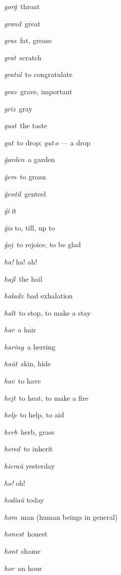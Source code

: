 \begin{landscape}
\begin{multicols}{5}
\begin{outdent}{1em}
\emph{gorĝ\,} throat

\emph{grand\,} great

\emph{gras\,} fat, grease

\emph{grat\,} scratch

\emph{gratul\,} to congratulate

\emph{grav\,} grave, important

\emph{griz\,} gray

\emph{gust\,} the taste

\emph{gut\,} to drop; \emph{gut\,o} — a drop
\end{outdent}


\begin{outdent}{1em}
\emph{ĝarden\,} a garden

\emph{ĝem\,} to groan

\emph{ĝentil\,} genteel

\emph{ĝi} it

\emph{ĝis} to, till, up to

\emph{ĝoj\,} to rejoice, to be glad
\end{outdent}


\begin{outdent}{1em}
\emph{ha!} ha! ah!

\emph{hajl\,} the hail

\emph{haladz\,} bad exhalation

\emph{halt\,} to stop, to make a stay

\emph{har\,} a hair

\emph{haring\,} a herring

\emph{haŭt\,} skin, hide

\emph{hav\,} to have

\emph{hejt\,} to heat, to make a fire

\emph{help\,} to help, to aid

\emph{herb\,} herb, grass

\emph{hered\,} to inherit

\emph{hieraŭ} yesterday

\emph{ho!} oh!

\emph{hodiaŭ} today

\emph{hom\,} man (human beings in general)

\emph{honest\,} honest

\emph{hont\,} shame

\emph{hor\,} an hour


\end{outdent}
\end{multicols}
\end{landscape}
